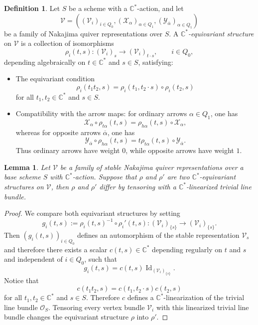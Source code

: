 \documentclass{amsart}
\theoremstyle{plain}
\newtheorem{lemma}[theorem]{Lemma}
\numberwithin{equation}{section}
\theoremstyle{definition}
\newtheorem{definition}[theorem]{Definition}
\theoremstyle{remark}
\begin{document}
	\begin{definition}\label{equivariantStructures}
		Let $S$ be a scheme with a $\mathbb{C}^*$-action, and let
		\[
		\mathcal V=
		\left(
		(\mathcal V_i)_{i\in Q_0},
		(\mathcal X_\alpha)_{\alpha\in Q_1},
		(\mathcal Y_{\overline\alpha})_{\alpha\in Q_1}
		\right)
		\]
		be a family of Nakajima quiver representations over $S$. A
		\emph{$\mathbb{C}^*$-equivariant structure} on $\mathcal V$ is a collection of
		isomorphisms
		\[
		\rho_i(t,s):(\mathcal V_i)_s\longrightarrow (\mathcal V_i)_{t\cdot s},
		\qquad i\in Q_0,
		\]
		depending algebraically on $t\in\mathbb{C}^*$ and $s\in S$, satisfying: 
		\begin{itemize}
			\item The equivariant condition
			$$
			\rho_i(t_1t_2,s)
			=
			\rho_i(t_1,t_2\cdot s)\circ \rho_i(t_2,s)
			$$
			for all $t_1,t_2\in\mathbb C^*$ and $s\in S$.
			\item Compatibility with the arrow maps: for ordinary arrows $\alpha\in Q_1$, one has
			\begin{equation}\label{compatibilityEqStructureWithArrows}
				\mathcal X_{\alpha}\circ \rho_{t\alpha}(t,s)
				=
				\rho_{h\alpha}(t,s)\circ \mathcal X_{\alpha},
			\end{equation}
			whereas for opposite arrows $\overline\alpha$, one has
			\begin{equation}\label{compatibilityEqStructureWithOppositeArrows}
				\mathcal Y_{\overline\alpha}\circ \rho_{h\alpha}(t,s)
				=
				t\rho_{t\alpha}(t,s)\circ \mathcal Y_{\overline\alpha}.
			\end{equation}
			Thus ordinary arrows have weight $0$, while opposite arrows have weight $1$.
		\end{itemize}
		
	\end{definition}
	\begin{lemma}\label{twoEquivariantStructuresDifferByALineBundle}
		Let $\mathcal V$
		be a family of stable Nakajima quiver representations over a base
		scheme $S$ with $\mathbb{C}^*$-action. Suppose that \(\rho\) and \(\rho'\) are two
		$\mathbb C^*$-equivariant structures on
		$\mathcal V$, then $\rho$ and $\rho'$ differ
		by tensoring with a $\mathbb C^*$-linearized trivial line bundle.
	\end{lemma}
	\begin{proof}
		We compare both equivariant structures by setting
		\[
		g_i(t,s):=\rho_i(t,s)^{-1}\circ \rho_i'(t,s):
		(\mathcal V_i)_{\{s\}}\longrightarrow(\mathcal V_i)_{\{s\}}.
		\]
		Then $(g_i(t,s))_{i\in Q_0}$ defines an automorphism of the stable
		representation $\mathcal V_s$ and therefore there exists a scalar
		$c(t,s)\in\mathbb C^*$ depending regularly on $t$ and $s$ and independent of $i\in Q_0$, such that
		$$
		g_i(t,s)=c(t,s)\operatorname{Id}_{(\mathcal V_i)_{\{s\}}}.
		$$
		Notice that
		$$
		c(t_1t_2,s)=c(t_1,t_2\cdot s)c(t_2,s)
		$$
		for all $t_1,t_2\in\mathbb C^*$ and $s\in S$. Therefore $c$ defines a
		$\mathbb C^*$-linearization of the trivial line bundle $\mathscr O_S$. Tensoring every vertex bundle $\mathcal V_i$ with this linearized trivial line
		bundle changes the equivariant structure $\rho$ into $\rho'$.
	\end{proof}
	
\end{document}
